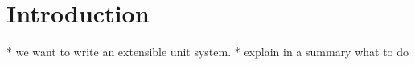 \section{Introduction}





* we want to write an extensible unit system.
* explain in a summary what to do
